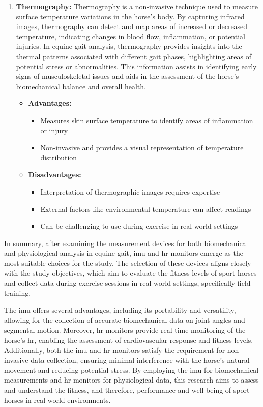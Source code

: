 \begin{enumerate}
\item \textbf{Thermography:} Thermography is a non-invasive technique used to measure surface temperature variations in the horse's body. By capturing infrared images, thermography can detect and map areas of increased or decreased temperature, indicating changes in blood flow, inflammation, or potential injuries. In equine gait analysis, thermography provides insights into the thermal patterns associated with different gait phases, highlighting areas of potential stress or abnormalities. This information assists in identifying early signs of musculoskeletal issues and aids in the assessment of the horse's biomechanical balance and overall health.
\begin{itemize}
\item[] \textbf{\small Advantages:}
\begin{itemize}
\item Measures skin surface temperature to identify areas of inflammation or injury
\item Non-invasive and provides a visual representation of temperature distribution
\end{itemize}
\item[] \textbf{\small Disadvantages:}
\begin{itemize}
\item Interpretation of thermographic images requires expertise
\item External factors like environmental temperature can affect readings
\item Can be challenging to use during exercise in real-world settings
\end{itemize}
\end{itemize}
\end{enumerate}

In summary, after examining the measurement devices for both biomechanical and physiological analysis in equine gait, \gls{imu} and \gls{hr} monitors emerge as the most suitable choices for the study. The selection of these devices aligns closely with the study objectives, which aim to evaluate the fitness levels of sport horses and collect data during exercise sessions in real-world settings, specifically field training. 

The \gls{imu} offers several advantages, including its portability and versatility, allowing for the collection of accurate biomechanical data on joint angles and segmental motion. Moreover, \gls{hr} monitors provide real-time monitoring of the horse's \gls{hr}, enabling the assessment of cardiovascular response and fitness levels. Additionally, both the \gls{imu} and \gls{hr} monitors satisfy the requirement for non-invasive data collection, ensuring minimal interference with the horse's natural movement and reducing potential stress. By employing the \gls{imu} for biomechanical measurements and \gls{hr} monitors for physiological data, this research aims to assess and understand the fitness, and therefore, performance and well-being of sport horses in real-world environments.


